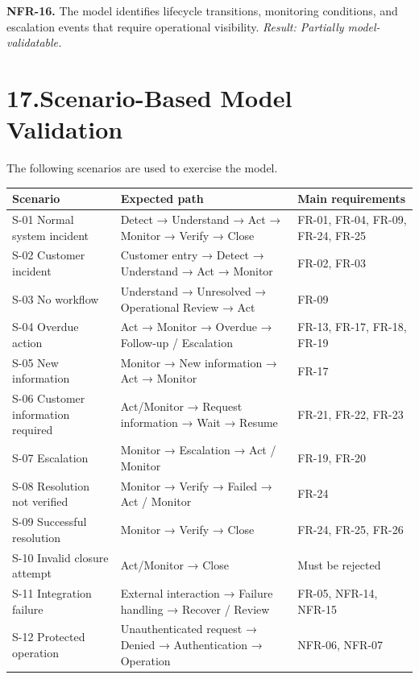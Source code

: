 \documentclass[11pt,a4paper]{article}
\begin{document}
\textbf{NFR-16.} The model identifies lifecycle transitions, monitoring conditions, and escalation events that require operational visibility. \textit{Result: Partially model-validatable.}

\section*{17.\enspace Scenario-Based Model Validation}

The following scenarios are used to exercise the model.

\begin{center}
\small
\begin{tabularx}{\textwidth}{@{} l X X @{}}
\toprule
\textbf{Scenario} & \textbf{Expected path} & \textbf{Main requirements} \\
\midrule
S-01 Normal system incident & Detect → Understand → Act → Monitor → Verify → Close & FR-01, FR-04, FR-09, FR-24, FR-25 \\
S-02 Customer incident & Customer entry → Detect → Understand → Act → Monitor & FR-02, FR-03 \\
S-03 No workflow & Understand → Unresolved → Operational Review → Act & FR-09 \\
S-04 Overdue action & Act → Monitor → Overdue → Follow-up / Escalation & FR-13, FR-17, FR-18, FR-19 \\
S-05 New information & Monitor → New information → Act → Monitor & FR-17 \\
S-06 Customer information required & Act/Monitor → Request information → Wait → Resume & FR-21, FR-22, FR-23 \\
S-07 Escalation & Monitor → Escalation → Act / Monitor & FR-19, FR-20 \\
S-08 Resolution not verified & Monitor → Verify → Failed → Act / Monitor & FR-24 \\
S-09 Successful resolution & Monitor → Verify → Close & FR-24, FR-25, FR-26 \\
S-10 Invalid closure attempt & Act/Monitor → Close & Must be rejected \\
S-11 Integration failure & External interaction → Failure handling → Recover / Review & FR-05, NFR-14, NFR-15 \\
S-12 Protected operation & Unauthenticated request → Denied → Authentication → Operation & NFR-06, NFR-07 \\
\bottomrule
\end{tabularx}
\end{center}
\end{document}
